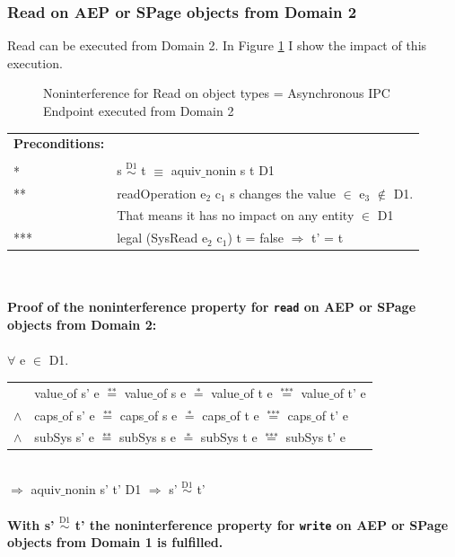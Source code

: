 \documentclass[11pt,a4paper,twoside]{article}
\begin{document}
{\subsubsection{Read on AEP or SPage objects from Domain 2}
Read can be executed from Domain 2. In Figure \ref{fig:ReadOut2} I show the impact of this execution. 
\begin{flushleft}
\begin{figure}[H]
\caption{Noninterference for Read on object types = Asynchronous IPC Endpoint executed from Domain 2}
\label{fig:ReadOut2}
\end{figure}
\end{flushleft}
\begin{tabular}{ll}
\textbf{Preconditions:} \\ \\
* & s $\overset{\text{D1}}{\sim}$ t $\equiv$ aquiv$\_$nonin s t D1	\\ 
** & readOperation e$_2$ c$_1$ s changes the value $\in$ e$_3$ $\notin$ D1. \\
& That means it has no impact on any entity $\in$ D1 \\ 
*** & legal (SysRead e$_2$ c$_1$) t = false $\Rightarrow$ t' = t
\end{tabular} \\ \\
\textbf{Proof of the noninterference property for \texttt{read} on AEP or SPage objects from Domain 2:}\\ \\
$\forall$ e $\in$ D1. \\
\begin{tabular}{ll}
& value$\_$of s' e $\overset{\text{**}}{=}$ value$\_$of s e $\overset{\text{*}}{=}$ value$\_$of t e $\overset{\text{***}}{=}$ value$\_$of t' e \\
$\wedge$ & caps$\_$of s' e $\overset{\text{**}}{=}$ caps$\_$of s e $\overset{\text{*}}{=}$ caps$\_$of t e $\overset{\text{***}}{=}$ caps$\_$of t' e \\
$\wedge$ & subSys s' e $\overset{\text{**}}{=}$ subSys s e $\overset{\text{*}}{=}$ subSys t e $\overset{\text{***}}{=}$ subSys t' e
\end{tabular} \\
$\Rightarrow$ aquiv$\_$nonin s' t' D1 $\Rightarrow$ s' $\overset{\text{D1}}{\sim}$ t' \\ \\
\textbf{With s' $\overset{\text{D1}}{\sim}$ t' the noninterference property for \texttt{write} on AEP or SPage objects from Domain 1 is fulfilled.}  
\clearpage
}
\end{document}
